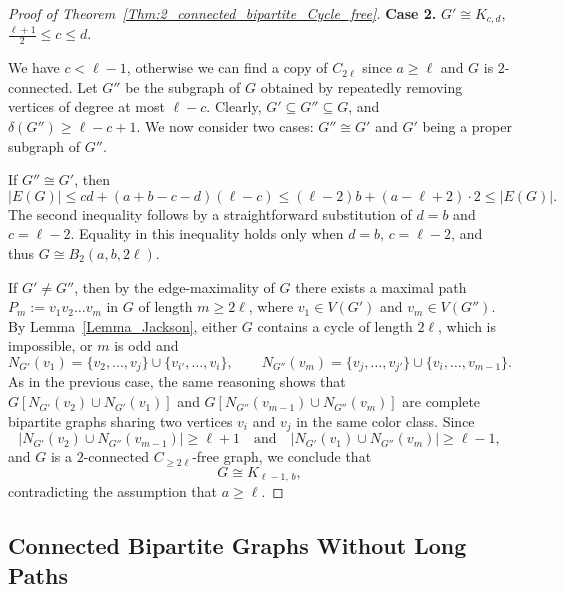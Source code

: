 \documentclass[11pt,a4paper]{article}
\begin{document}
\begin{proof}[Proof of Theorem~\ref{Thm:2_connected_bipartite_Cycle_free}]
\textbf{Case 2.} $G' \cong K_{c,d}$, $\frac{\ell+1}{2}\leq c \leq d$.

We have $c < \ell - 1$, otherwise we can find a copy of $C_{2\ell}$ since $a \ge \ell$ and $G$ is $2$-connected.  
Let $G''$ be the subgraph of $G$ obtained by repeatedly removing vertices of degree at most $\ell - c$.  
Clearly, $G' \subseteq G'' \subseteq G$, and $\delta(G'') \ge \ell - c + 1$.  
We now consider two cases: $G'' \cong G'$ and $G'$ being a proper subgraph of $G''$.

If $G'' \cong G'$, then
\[
|E(G)| \le cd + (a + b - c - d)(\ell - c)
      \le (\ell - 2)b + (a - \ell + 2)\cdot 2 \le |E(G)|.
\]
The second inequality follows by a straightforward substitution of $d = b$ and $c = \ell - 2$.  
Equality in this inequality holds only when $d = b$, $c = \ell - 2$, and thus $G \cong B_{2}(a,b,2\ell)$.

If $G' \ne G''$, then by the edge-maximality of $G$ there exists a maximal path $P_m := v_1 v_2 \dots v_m$ in $G$ of length $m \ge 2\ell$, 
where $v_1 \in V(G')$ and $v_m \in V(G'')$.  
By Lemma~\ref{Lemma_Jackson}, either $G$ contains a cycle of length $2\ell$, which is impossible, 
or $m$ is odd and
\[
N_{G'}(v_1) = \{v_2, \dots, v_j\} \cup \{v_{i'}, \dots, v_i\},
\qquad
N_{G''}(v_m) = \{v_j, \dots, v_{j'}\} \cup \{v_i, \dots, v_{m-1}\}.
\]
As in the previous case, the same reasoning shows that 
$G[N_{G'}(v_2)\cup N_{G'}(v_1)]$ and 
$G[N_{G''}(v_{m-1})\cup N_{G''}(v_m)]$ 
are complete bipartite graphs sharing two vertices $v_i$ and $v_j$ in the same color class.  
Since 
\[
|N_{G'}(v_2)\cup N_{G''}(v_{m-1})| \ge \ell + 1 
\quad\text{and}\quad 
|N_{G'}(v_1)\cup N_{G''}(v_m)| \ge \ell - 1,
\]
and $G$ is a $2$-connected $C_{\ge 2\ell}$-free graph, we conclude that
\[
G \cong K_{\ell - 1,\, b},
\]
contradicting the assumption that $a \ge \ell$.
\end{proof} 



\subsection{Connected Bipartite Graphs Without Long Paths}\label{Sub:Corollary}
\end{document}
